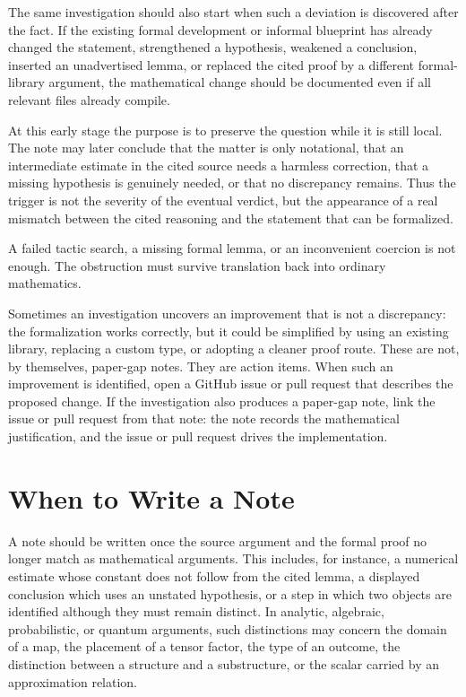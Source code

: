 \documentclass[11pt]{article}
\begin{document}
The same investigation should also start when such a deviation is discovered
after the fact.  If the existing formal development or informal blueprint has
already changed the statement, strengthened a hypothesis, weakened a conclusion,
inserted an unadvertised lemma, or replaced the cited proof by a different
formal-library argument, the mathematical change should be documented even if all
relevant files already compile.

At this early stage the purpose is to preserve the question while it is still
local.  The note may later conclude that the matter is only notational, that an
intermediate estimate in the cited source needs a harmless correction, that a
missing hypothesis is genuinely needed, or that no discrepancy remains.  Thus
the trigger is not the severity of the eventual verdict, but the appearance of a
real mismatch between the cited reasoning and the statement that can be
formalized.

A failed tactic search, a missing formal lemma, or an inconvenient coercion is
not enough.  The obstruction must survive translation back into ordinary
mathematics.

Sometimes an investigation uncovers an improvement that is not a discrepancy:
the formalization works correctly, but it could be simplified by using an
existing library, replacing a custom type, or adopting a cleaner proof route.
These are not, by themselves, paper-gap notes.  They are action items.  When
such an improvement is identified, open a GitHub issue or pull request that
describes the proposed change.  If the investigation also produces a paper-gap
note, link the issue or pull request from that note: the note records the
mathematical justification, and the issue or pull request drives the
implementation.

\section{When to Write a Note}

A note should be written once the source argument and the formal proof no longer
match as mathematical arguments.  This includes, for instance, a numerical
estimate whose constant does not follow from the cited lemma, a displayed
conclusion which uses an unstated hypothesis, or a step in which two objects are
identified although they must remain distinct.  In analytic, algebraic,
probabilistic, or quantum arguments, such distinctions may concern the domain of
a map, the placement of a tensor factor, the type of an outcome, the distinction
between a structure and a substructure, or the scalar carried by an approximation
relation.
\end{document}
